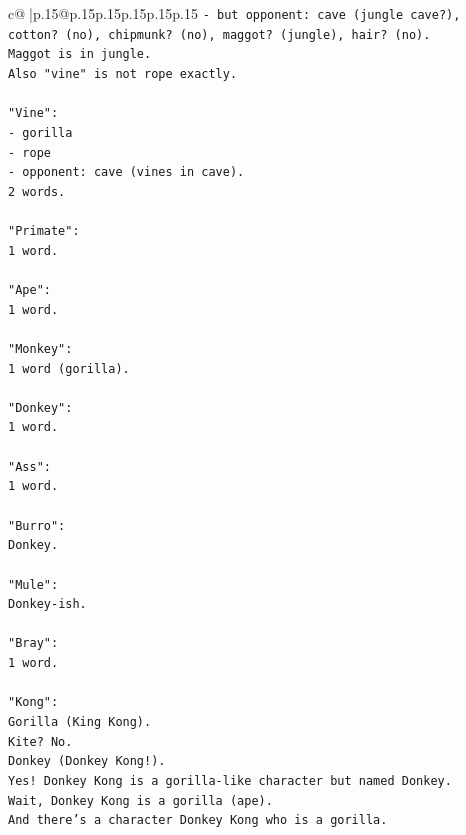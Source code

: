 \documentclass{article}
\begin{document}
{\begin{supertabular}{c@{$\;$}|p{.15\linewidth}@{}p{.15\linewidth}p{.15\linewidth}p{.15\linewidth}p{.15\linewidth}p{.15\linewidth}}
{{{\texttt{{-} but opponent: cave (jungle cave?), cotton? (no), chipmunk? (no), maggot? (jungle), hair? (no).} \\
\texttt{Maggot is in jungle.} \\
\texttt{Also "vine" is not rope exactly.} \\
\\ 
\texttt{"Vine":} \\
\texttt{{-} gorilla} \\
\texttt{{-} rope} \\
\texttt{{-} opponent: cave (vines in cave).} \\
\texttt{2 words.} \\
\\ 
\texttt{"Primate":} \\
\texttt{1 word.} \\
\\ 
\texttt{"Ape":} \\
\texttt{1 word.} \\
\\ 
\texttt{"Monkey":} \\
\texttt{1 word (gorilla).} \\
\\ 
\texttt{"Donkey":} \\
\texttt{1 word.} \\
\\ 
\texttt{"Ass":} \\
\texttt{1 word.} \\
\\ 
\texttt{"Burro":} \\
\texttt{Donkey.} \\
\\ 
\texttt{"Mule":} \\
\texttt{Donkey{-}ish.} \\
\\ 
\texttt{"Bray":} \\
\texttt{1 word.} \\
\\ 
\texttt{"Kong":} \\
\texttt{Gorilla (King Kong).} \\
\texttt{Kite? No.} \\
\texttt{Donkey (Donkey Kong!).} \\
\texttt{Yes! Donkey Kong is a gorilla{-}like character but named Donkey.} \\
\texttt{Wait, Donkey Kong is a gorilla (ape).} \\
\texttt{And there's a character Donkey Kong who is a gorilla.} \\
}}}
\end{supertabular}}
\end{document}
